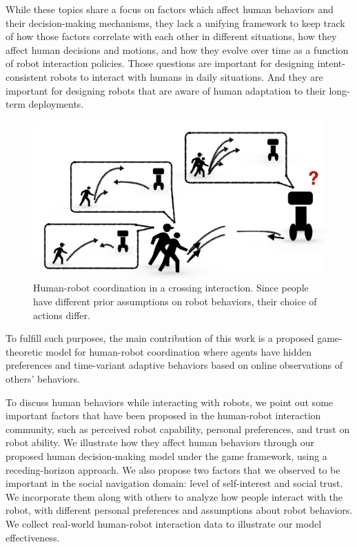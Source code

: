 \documentclass[letterpaper, 10 pt, conference]{ieeeconf}  %
\begin{document}
While these topics share a focus on factors which affect human behaviors and 
their decision-making mechanisms, 
they lack a unifying framework to keep track of how those factors correlate with 
each other in different situations, how they affect human 
decisions and motions, and 
how they evolve over time as a function of robot interaction policies. 
Those questions are important for designing intent-consistent robots to 
interact with humans in daily situations. And they are important for 
designing 
robots that are aware of human 
adaptation to their long-term deployments.  
\begin{figure}[t]
	\centering
	\vspace{-1em}
	\includegraphics[scale=0.32]{intro}
	\vspace{-1.5em}
	\caption{Human-robot coordination in a crossing interaction. Since 
		people have different prior assumptions on robot behaviors, their choice 
		of actions differ.}
	\vspace{-2em}
	\label{fig:intro}
\end{figure}
To fulfill such purposes, the main contribution of this work is a proposed game-theoretic 
model for human-robot coordination where agents have hidden preferences and time-variant adaptive behaviors based 
on online observations of others' behaviors.

To discuss human behaviors while interacting with robots, we point out some
important factors that have been proposed in the human-robot interaction 
community, such as perceived robot capability, personal preferences, and 
trust on robot ability. We illustrate how they affect human behaviors through 
our proposed human decision-making model under the game framework, using a 
receding-horizon approach. We also propose two factors that we observed to be 
important in the social navigation 
domain: level of self-interest and social trust. We incorporate them along 
with others to analyze how people interact with the robot, with different 
personal preferences and assumptions about robot 
behaviors. We collect real-world human-robot interaction data to 
illustrate our model effectiveness. 
\end{document}
